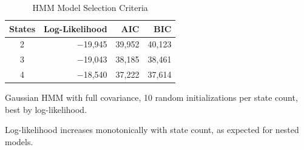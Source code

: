 \begin{table}[H]
\begin{threeparttable}
\centering
\caption{HMM Model Selection Criteria}
\label{tab:hmm_selection}
\small
\begin{tabular}{@{}c*{3}{r}@{}}
\toprule
States & Log-Likelihood & AIC & BIC \\
\midrule
2 & ${-}$19,945 & 39,952 & 40,123 \\
3 & ${-}$19,043 & 38,185 & 38,461 \\
4 & ${-}$18,540 & 37,222 & 37,614 \\
\bottomrule
\end{tabular}
\begin{tablenotes}
\small
\item Gaussian HMM with full covariance, 10 random initializations per state count, best by log-likelihood.
\item Log-likelihood increases monotonically with state count, as expected for nested models.
\end{tablenotes}
\end{threeparttable}
\end{table}